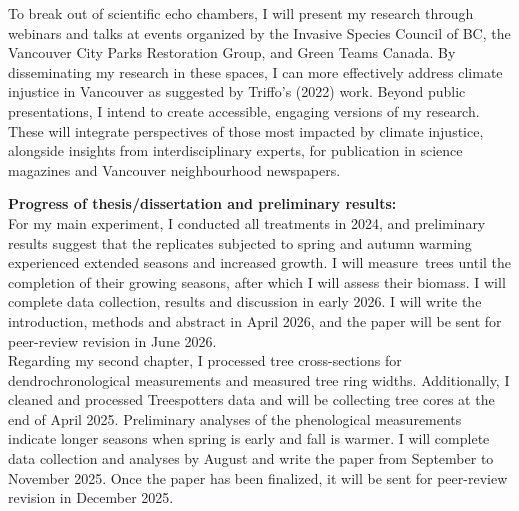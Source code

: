 \documentclass[11pt,letter]{article}
\begin{document}
To break out of scientific echo chambers, I will present my research through webinars and talks at events organized by the Invasive Species Council of BC, the Vancouver City Parks Restoration Group, and Green Teams Canada. By disseminating my research in these spaces, I can more effectively address climate injustice in Vancouver as suggested by Triffo’s (2022) work.  \citep{triffo_green_2022} Beyond public presentations, I  intend to create accessible, engaging versions of my research. These will integrate perspectives of those most impacted by climate injustice, alongside insights from interdisciplinary experts, for publication in science magazines and Vancouver neighbourhood newspapers.
\par
\textbf{Progress of thesis/dissertation and preliminary results:}\\ 
For my main experiment, I conducted all treatments in 2024, and preliminary results suggest that the replicates subjected to spring and autumn warming experienced extended seasons and increased growth. I will measure trees until the completion of their growing seasons, after which I will assess their biomass. I will complete data collection, results and discussion in early 2026. I will write the introduction, methods and abstract in April  2026, and the paper will be sent for peer-review revision in June 2026.
\\
Regarding my second chapter, I processed tree cross-sections for dendrochronological measurements and measured tree ring widths. Additionally, I cleaned and processed Treespotters data and will be collecting tree cores at the end of April 2025. Preliminary analyses of the phenological measurements indicate longer seasons when spring is early and fall is warmer. I will complete data collection and analyses by August and write the paper from September to November 2025. Once the paper has been finalized, it will be sent for peer-review revision in December 2025.
\end{document}
